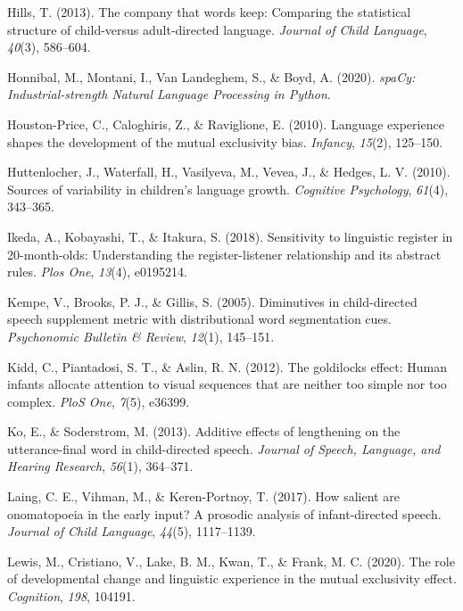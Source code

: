 \documentclass[10pt, letterpaper]{article}
\newenvironment{CSLReferences}%
  {}%
  {\par}
\begin{document}
\begin{CSLReferences}
\leavevmode\hypertarget{ref-hills2013company}{}%
Hills, T. (2013). The company that words keep: Comparing the statistical
structure of child-versus adult-directed language. \emph{Journal of
Child Language}, \emph{40}(3), 586--604.

\leavevmode\hypertarget{ref-honnibal2020spacy}{}%
Honnibal, M., Montani, I., Van Landeghem, S., \& Boyd, A. (2020).
\emph{{spaCy: Industrial-strength Natural Language Processing in
Python}}.

\leavevmode\hypertarget{ref-houston2010language}{}%
Houston-Price, C., Caloghiris, Z., \& Raviglione, E. (2010). Language
experience shapes the development of the mutual exclusivity bias.
\emph{Infancy}, \emph{15}(2), 125--150.

\leavevmode\hypertarget{ref-huttenlocher2010sources}{}%
Huttenlocher, J., Waterfall, H., Vasilyeva, M., Vevea, J., \& Hedges, L.
V. (2010). Sources of variability in children's language growth.
\emph{Cognitive Psychology}, \emph{61}(4), 343--365.

\leavevmode\hypertarget{ref-ikeda2018sensitivity}{}%
Ikeda, A., Kobayashi, T., \& Itakura, S. (2018). Sensitivity to
linguistic register in 20-month-olds: Understanding the
register-listener relationship and its abstract rules. \emph{Plos One},
\emph{13}(4), e0195214.

\leavevmode\hypertarget{ref-kempe2005diminutives}{}%
Kempe, V., Brooks, P. J., \& Gillis, S. (2005). Diminutives in
child-directed speech supplement metric with distributional word
segmentation cues. \emph{Psychonomic Bulletin \& Review}, \emph{12}(1),
145--151.

\leavevmode\hypertarget{ref-kidd2012goldilocks}{}%
Kidd, C., Piantadosi, S. T., \& Aslin, R. N. (2012). The goldilocks
effect: Human infants allocate attention to visual sequences that are
neither too simple nor too complex. \emph{PloS One}, \emph{7}(5),
e36399.

\leavevmode\hypertarget{ref-ko2013additive}{}%
Ko, E., \& Soderstrom, M. (2013). Additive effects of lengthening on the
utterance-final word in child-directed speech. \emph{Journal of Speech,
Language, and Hearing Research}, \emph{56}(1), 364--371.

\leavevmode\hypertarget{ref-laing2017salient}{}%
Laing, C. E., Vihman, M., \& Keren-Portnoy, T. (2017). How salient are
onomatopoeia in the early input? A prosodic analysis of infant-directed
speech. \emph{Journal of Child Language}, \emph{44}(5), 1117--1139.

\leavevmode\hypertarget{ref-lewis2020role}{}%
Lewis, M., Cristiano, V., Lake, B. M., Kwan, T., \& Frank, M. C. (2020).
The role of developmental change and linguistic experience in the mutual
exclusivity effect. \emph{Cognition}, \emph{198}, 104191.


\end{CSLReferences}
\end{document}
